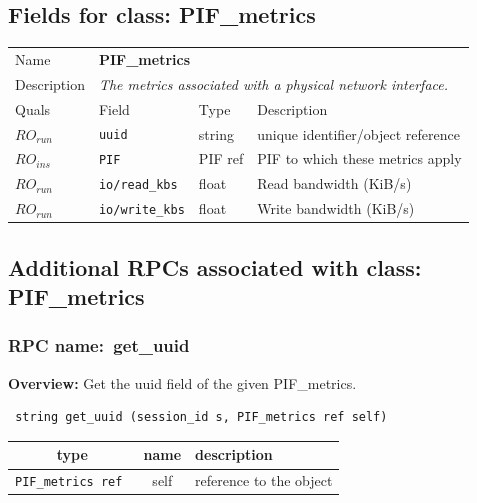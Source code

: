 \subsection{Fields for class: PIF\_metrics}
\begin{longtable}{|lllp{}|}
\hline
\multicolumn{1}{|l}{Name} & \multicolumn{3}{l|}{\bf PIF\_metrics} \\
\multicolumn{1}{|l}{Description} & \multicolumn{3}{l|}{\parbox{11cm}{\em
The metrics associated with a physical network interface.}} \\
\hline
Quals & Field & Type & Description \\
\hline
$\mathit{RO}_\mathit{run}$ &  {\tt uuid} & string & unique identifier/object reference \\
$\mathit{RO}_\mathit{ins}$ &  {\tt PIF} & PIF ref & PIF to which these metrics apply \\
$\mathit{RO}_\mathit{run}$ &  {\tt io/read\_kbs} & float & Read bandwidth (KiB/s) \\
$\mathit{RO}_\mathit{run}$ &  {\tt io/write\_kbs} & float & Write bandwidth (KiB/s) \\
\hline
\end{longtable}
\subsection{Additional RPCs associated with class: PIF\_metrics}
\subsubsection{RPC name:~get\_uuid}

{\bf Overview:} 
Get the uuid field of the given PIF\_metrics.

\begin{verbatim} string get_uuid (session_id s, PIF_metrics ref self)\end{verbatim}



 
\vspace{0.3cm}
\begin{tabular}{|c|c|p{7cm}|}
 \hline
{\bf type} & {\bf name} & {\bf description} \\ \hline
{\tt PIF\_metrics ref } & self & reference to the object \\ \hline 

\end{tabular}

\vspace{0.3cm}

